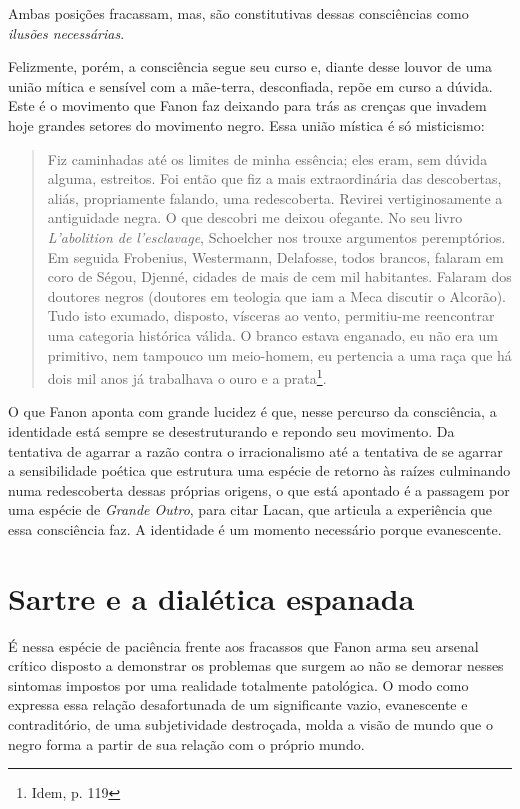 Ambas posições fracassam, mas, são constitutivas dessas consciências
como \emph{ilusões necessárias}.

Felizmente, porém, a consciência segue seu curso e, diante desse louvor
de uma união mítica e sensível com a mãe-terra, desconfiada, repõe em
curso a dúvida. Este é o movimento que Fanon faz deixando para trás as
crenças que invadem hoje grandes setores do movimento negro. Essa união
mística é só misticismo:

\begin{quote}
Fiz caminhadas até os limites de minha essência; eles eram, sem dúvida
alguma, estreitos. Foi então que fiz a mais extraordinária das
descobertas, aliás, propriamente falando, uma redescoberta. Revirei
vertiginosamente a antiguidade negra. O que descobri me deixou ofegante.
No seu livro \emph{L'abolition de l'esclavage}, Schoelcher nos trouxe
argumentos peremptórios. Em seguida Frobenius, Westermann, Delafosse,
todos brancos, falaram em coro de Ségou, Djenné, cidades de mais de cem
mil habitantes. Falaram dos doutores negros (doutores em teologia que
iam a Meca discutir o Alcorão). Tudo isto exumado, disposto, vísceras ao
vento, permitiu-me reencontrar uma categoria histórica válida. O branco
estava enganado, eu não era um primitivo, nem tampouco um meio-homem, eu
pertencia a uma raça que há dois mil anos já trabalhava o ouro e a
prata\footnote{Idem, p. 119}.
\end{quote}

O que Fanon aponta com grande lucidez é que, nesse percurso da
consciência, a identidade está sempre se desestruturando e repondo seu
movimento. Da tentativa de agarrar a razão contra o irracionalismo até a
tentativa de se agarrar a sensibilidade poética que estrutura uma
espécie de retorno às raízes culminando numa redescoberta dessas
próprias origens, o que está apontado é a passagem por uma espécie de
\emph{Grande Outro}, para citar Lacan, que articula a experiência que
essa consciência faz. A identidade é um momento necessário porque
evanescente.

\chapter{Sartre e a dialética espanada}

É nessa espécie de paciência frente aos fracassos que Fanon arma seu
arsenal crítico disposto a demonstrar os problemas que surgem ao não se
demorar nesses sintomas impostos por uma realidade totalmente
patológica. O modo como expressa essa relação desafortunada de um
significante vazio, evanescente e contraditório, de uma subjetividade
destroçada, molda a visão de mundo que o negro forma a partir de sua
relação com o próprio mundo.

